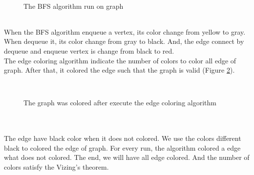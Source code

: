 \begin{figure}[h!]
\centering
{}~~
\caption{The BFS algorithm run on graph}
\label{fig:Figure_2}
\end{figure}\\
When the BFS algorithm enqueue a vertex, its color change from yellow to gray. When dequeue it, its color change from gray to black. And, the edge connect by dequeue and enqueue vertex is change from black to red.
\\
The edge coloring algorithm indicate the number of colors to color all edge of graph. After that, it colored the edge such that the graph is valid (Figure \ref{fig:Figure_3}).\\
\begin{figure}[h!]
\centering
{}~~
\caption{The graph was colored after execute the edge coloring algorithm}
\label{fig:Figure_3}
\end{figure}\\\\
The edge have black color when it does not colored. We use the colors different black to colored the edge of graph. For every run, the algorithm colored a edge what does not colored. The end, we will have all edge colored. And the number of colors satisfy the Vizing's theorem.
